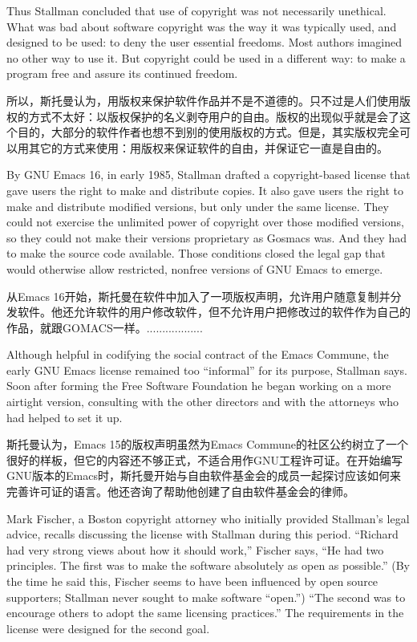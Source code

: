 \ifdefined\eng
Thus Stallman concluded that use of copyright was not necessarily unethical.  What was bad about software copyright was the way it was typically used, and designed to be used: to deny the user essential freedoms.  Most authors imagined no other way to use it.  But copyright could be used in a different way: to make a program free and assure its continued freedom.
\fi

\ifdefined\chs
所以，斯托曼认为，用版权来保护软件作品并不是不道德的。只不过是人们使用版权的方式不太好：以版权保护的名义剥夺用户的自由。版权的出现似乎就是会了这个目的，大部分的软件作者也想不到别的使用版权的方式。但是，其实版权完全可以用其它的方式来使用：用版权来保证软件的自由，并保证它一直是自由的。
\fi

\ifdefined\eng
By GNU Emacs 16, in early 1985, Stallman drafted a copyright-based license that gave users the right to make and distribute copies. It also gave users the right to make and distribute modified versions, but only under the same license.  They could not exercise the unlimited power of copyright over those modified versions, so they could not make their versions proprietary as Gosmacs was.  And they had to make the source code available.  Those conditions closed the legal gap that would otherwise allow restricted, nonfree versions of GNU Emacs to emerge.
\fi

\ifdefined\chs
从Emacs 16开始，斯托曼在软件中加入了一项版权声明，允许用户随意复制并分发软件。他还允许软件的用户修改软件，但不允许用户把修改过的软件作为自己的作品，就跟GOMACS一样。..................
\fi

\ifdefined\eng
Although helpful in codifying the social contract of the Emacs Commune, the early GNU Emacs license remained too ``informal'' for its purpose, Stallman says. Soon after forming the Free Software Foundation he began working on a more airtight version, consulting with the other directors and with the attorneys who had helped to set it up.
\fi

\ifdefined\chs
斯托曼认为，Emacs 15的版权声明虽然为Emacs Commune的社区公约树立了一个很好的样板，但它的内容还不够正式，不适合用作GNU工程许可证。在开始编写GNU版本的Emacs时，斯托曼开始与自由软件基金会的成员一起探讨应该如何来完善许可证的语言。他还咨询了帮助他创建了自由软件基金会的律师。
\fi

\ifdefined\eng
Mark Fischer, a Boston copyright attorney who initially provided Stallman's legal advice, recalls discussing the license with Stallman during this period. ``Richard had very strong views about how it should work,'' Fischer says, ``He had two principles. The first was to make the software absolutely as open as possible.'' (By the time he said this, Fischer seems to have been influenced by open source supporters; Stallman never sought to make software ``open.'') ``The second was to encourage others to adopt the same licensing practices.''  The requirements in the license were designed for the second goal.
\fi


